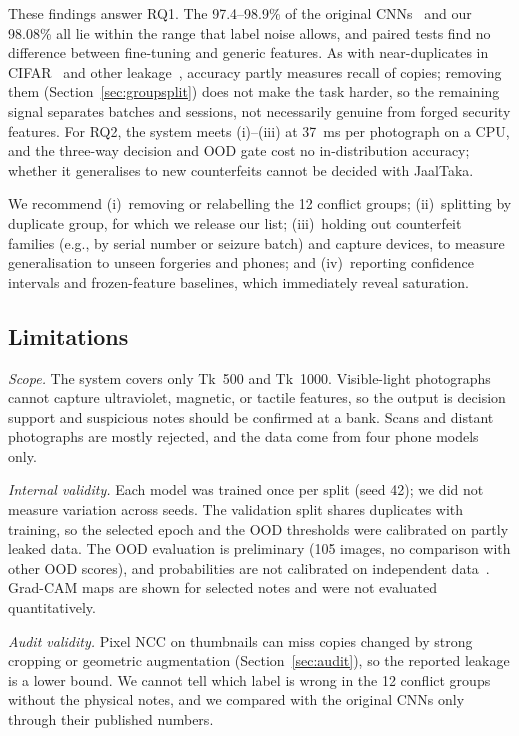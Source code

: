 \documentclass[pdflatex,sn-mathphys-num]{sn-jnl}
\begin{document}
These findings answer RQ1. The 97.4--98.9\% of the original
CNNs~\cite{piyas2025jaaltaka} and our 98.08\% all lie within the range that label noise
allows, and paired tests find no difference between fine-tuning and generic features.
As with near-duplicates in CIFAR~\cite{barz2020cifair} and other
leakage~\cite{kapoor2023leakage}, accuracy partly measures recall of copies; removing
them (Section~\ref{sec:groupsplit}) does not make the task harder, so the remaining
signal separates batches and sessions, not necessarily genuine from forged security
features. For RQ2, the system meets (i)--(iii) at 37~ms per photograph on a CPU, and the
three-way decision and OOD gate cost no in-distribution accuracy; whether it generalises
to new counterfeits cannot be decided with JaalTaka.

We recommend (i)~removing or relabelling the 12 conflict groups; (ii)~splitting by
duplicate group, for which we release our list; (iii)~holding out counterfeit families
(e.g., by serial number or seizure batch) and capture devices, to measure generalisation
to unseen forgeries and phones; and (iv)~reporting confidence intervals and
frozen-feature baselines, which immediately reveal saturation.

\subsection{Limitations}\label{sec:limits}

\emph{Scope.} The system covers only Tk~500 and Tk~1000. Visible-light photographs
cannot capture ultraviolet, magnetic, or tactile features, so the output is decision
support and suspicious notes should be confirmed at a bank. Scans and distant
photographs are mostly rejected, and the data come from four phone models only.

\emph{Internal validity.} Each model was trained once per split (seed 42); we did not
measure variation across seeds. The validation split shares duplicates with training,
so the selected epoch and the OOD thresholds were calibrated on partly leaked data. The
OOD evaluation is preliminary (105 images, no comparison with other OOD scores), and
probabilities are not calibrated on independent data~\cite{guo2017calibration}.
Grad-CAM maps are shown for selected notes and were not evaluated quantitatively.

\emph{Audit validity.} Pixel NCC on thumbnails can miss copies changed by strong
cropping or geometric augmentation (Section~\ref{sec:audit}), so the reported leakage is
a lower bound. We cannot tell which label is wrong in the 12 conflict groups without the
physical notes, and we compared with the original CNNs only through their published
numbers.
\end{document}
